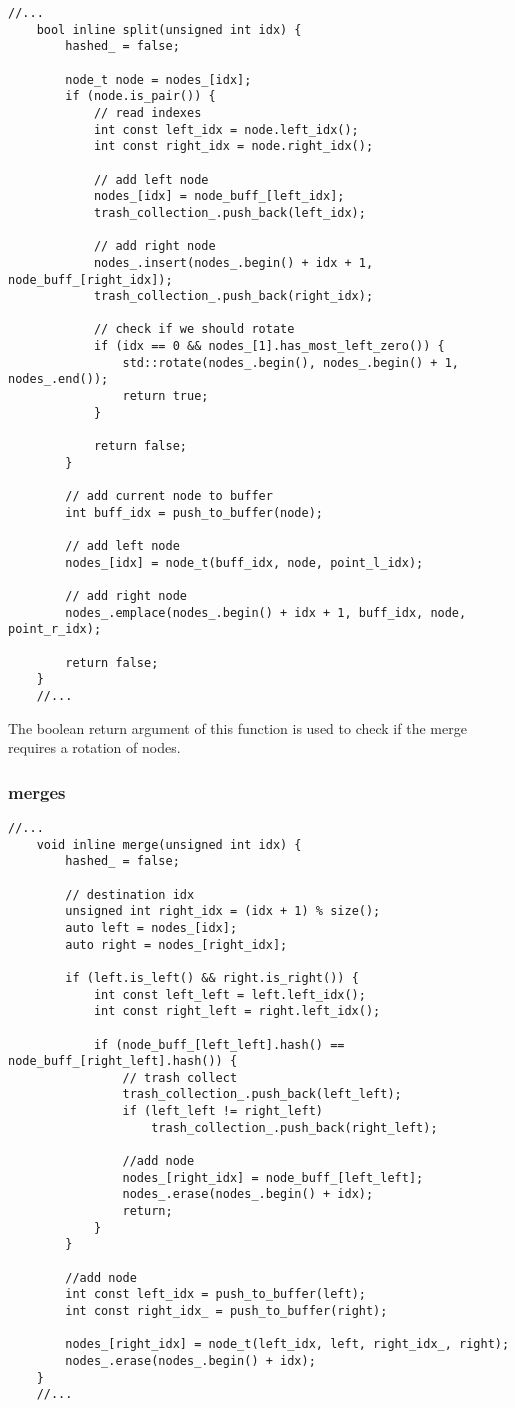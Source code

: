 \documentclass[11pt]{article}
\begin{document}
\begin{lstlisting}[style=CStyle]
	//...
	bool inline split(unsigned int idx) {
		hashed_ = false;

		node_t node = nodes_[idx];
		if (node.is_pair()) {
			// read indexes
			int const left_idx = node.left_idx();
			int const right_idx = node.right_idx();

			// add left node
			nodes_[idx] = node_buff_[left_idx];
			trash_collection_.push_back(left_idx);

			// add right node
			nodes_.insert(nodes_.begin() + idx + 1, node_buff_[right_idx]);
			trash_collection_.push_back(right_idx);

			// check if we should rotate
			if (idx == 0 && nodes_[1].has_most_left_zero()) {
				std::rotate(nodes_.begin(), nodes_.begin() + 1, nodes_.end());
				return true; 
			}

			return false;
		}

		// add current node to buffer
		int buff_idx = push_to_buffer(node);

		// add left node
		nodes_[idx] = node_t(buff_idx, node, point_l_idx);

		// add right node
		nodes_.emplace(nodes_.begin() + idx + 1, buff_idx, node, point_r_idx);
		
		return false;
	}
	//...
\end{lstlisting}

The boolean return argument of this function is used to check if the merge requires a rotation of nodes.

\subsubsection{merges}

\begin{lstlisting}[style=CStyle]
	//...
	void inline merge(unsigned int idx) {
		hashed_ = false;

		// destination idx
		unsigned int right_idx = (idx + 1) % size();
		auto left = nodes_[idx];
		auto right = nodes_[right_idx];

		if (left.is_left() && right.is_right()) {
			int const left_left = left.left_idx();
			int const right_left = right.left_idx();

			if (node_buff_[left_left].hash() == node_buff_[right_left].hash()) {
				// trash collect
				trash_collection_.push_back(left_left);
				if (left_left != right_left)
					trash_collection_.push_back(right_left);

				//add node
				nodes_[right_idx] = node_buff_[left_left];
				nodes_.erase(nodes_.begin() + idx);
				return;
			}
		}

		//add node
		int const left_idx = push_to_buffer(left);
		int const right_idx_ = push_to_buffer(right);

		nodes_[right_idx] = node_t(left_idx, left, right_idx_, right);
		nodes_.erase(nodes_.begin() + idx);
	}
	//...
\end{lstlisting}
\end{document}
